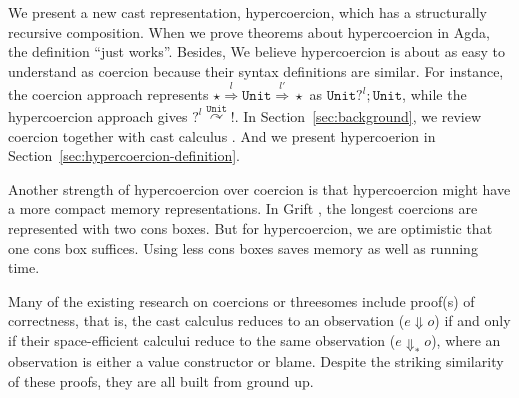 \documentclass[acmsmall,review,anonymous]{acmart}\settopmatter{printfolios=true,printccs=false,printacmref=false}
\newcommand{\TOOdyn}[0]{\star}
\newcommand{\POOunit}[0]{\mathtt{Unit}}
\newcommand{\cOOcast}[3]{#1 \overset{#2}{\Rightarrow} #3}
\newcommand{\hyperCoercionC}[3]{#1 \overset{#2}{\curvearrowright} #3}
\begin{document}

We present a new cast representation, hypercoercion, which has a structurally 
recursive composition. When we prove theorems about hypercoercion in Agda, the 
definition ``just works''. 
Besides, We believe hypercoercion is about as easy to understand as coercion 
because their syntax definitions are similar. For instance, the 
coercion approach represents $ 
\cOOcast{\TOOdyn}{l}{\cOOcast{\POOunit}{l'}{\TOOdyn}} $ as $ \POOunit 
?^{l} ; \POOunit\! $, while the hypercoercion approach gives $ 
\hyperCoercionC{?^l}{\POOunit}{!} $. In Section~\ref{sec:background}, we review 
coercion together with cast calculus 
\citep{siek2009exploring}\citep{kuhlenschmidt2018efficient}. And we 
present hypercoerion in Section~\ref{sec:hypercoercion-definition}.

Another strength of hypercoercion over coercion is that hypercoercion might 
have a more compact memory representations. In Grift 
\citep{kuhlenschmidt2018efficient}, the longest coercions are represented with
two cons boxes. But for hypercoercion, we are optimistic that one cons box 
suffices. Using less cons boxes saves memory as well as running time.

Many of the existing research on coercions or threesomes include proof(s) of 
correctness, that is, the cast calculus reduces to an observation ($ e 
\Downarrow o $) if and only if their space-efficient calcului reduce to the 
same observation ($ e \Downarrow_{*} o $), where an observation is either a 
value constructor or 
blame. 
Despite the striking similarity of these proofs, they are all built from ground 
up.
\end{document}
